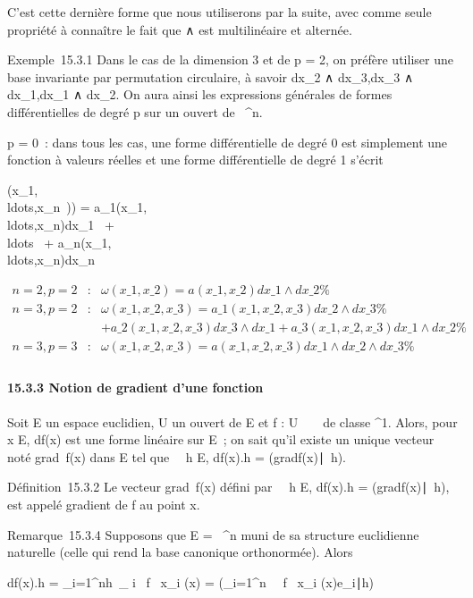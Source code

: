 \documentclass[]{article}
\begin{document}
C'est cette dernière forme que nous utiliserons par la suite, avec comme
seule propriété à connaître le fait que ∧ est multilinéaire et alternée.

Exemple~15.3.1 Dans le cas de la dimension 3 et de p = 2, on préfère
utiliser une base invariante par permutation circulaire, à savoir
dx\_2 ∧ dx\_3,dx\_3 ∧
dx\_1,dx\_1 ∧ dx\_2. On aura ainsi les
expressions générales de formes différentielles de degré p sur un ouvert
de ~^n.

p = 0~: dans tous les cas, une forme différentielle de degré 0 est
simplement une fonction à valeurs réelles et une forme différentielle de
degré 1 s'écrit

\omega(x\_1,\\ldots,x\_n~))
=
a\_1(x\_1,\\ldots,x\_n)dx\_1~
+ \\ldots~ +
a\_n(x\_1,\\ldots,x\_n)dx\_n~

\begin{align*} n = 2,p = 2& :&
\omega(x\_1,x\_2) = a(x\_1,x\_2)dx\_1
∧ dx\_2 \%& \\ n = 3,p = 2& :&
\omega(x\_1,x\_2,x\_3) =
a\_1(x\_1,x\_2,x\_3)dx\_2 ∧
dx\_3 \%& \\ & &
+a\_2(x\_1,x\_2,x\_3)dx\_3 ∧
dx\_1 +
a\_3(x\_1,x\_2,x\_3)dx\_1 ∧
dx\_2\%& \\ n = 3,p = 3& :&
\omega(x\_1,x\_2,x\_3) =
a(x\_1,x\_2,x\_3)dx\_1 ∧ dx\_2 ∧
dx\_3 \%& \\
\end{align*}

\paragraph{15.3.3 Notion de gradient d'une fonction}

Soit E un espace euclidien, U un ouvert de E et f : U \rightarrow~ ~ de classe
^1. Alors, pour x \in E, df(x) est une forme linéaire sur E~;
on sait qu'il existe un unique vecteur noté
grad~f(x) dans E tel que
\forall~~h \in E, df(x).h =
(gradf(x)\mathrel∣~h).

Définition~15.3.2 Le vecteur grad~f(x) défini
par \forall~~h \in E, df(x).h =
(gradf(x)\mathrel∣~h), est
appelé gradient de f au point x.

Remarque~15.3.4 Supposons que E = ~^n muni de sa structure
euclidienne naturelle (celle qui rend la base canonique orthonormée).
Alors

df(x).h = \sum \_i=1^nh~\_
i \partial~f \over \partial~x\_i (x) =
(\sum \_i=1^n~ \partial~f
\over \partial~x\_i
(x)e\_i∣h)
\end{document}

